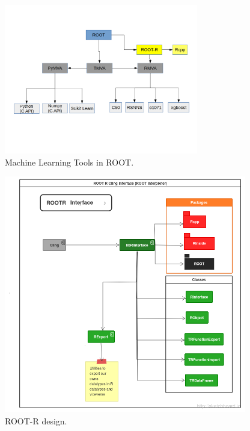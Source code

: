 \documentclass[a4paper]{jpconf}
\begin{document}
\begin{figure}[h]
\centering
\includegraphics[width=20pc]{img/tmva.png}\caption{\label{tmva:label} Machine Learning Tools in ROOT.}
\end{figure}



\begin{figure}[h]
\centering
\includegraphics[width=25pc]{img/rootr.png}\caption{\label{rootr:label} ROOT-R design.}
\end{figure}
\end{document}
